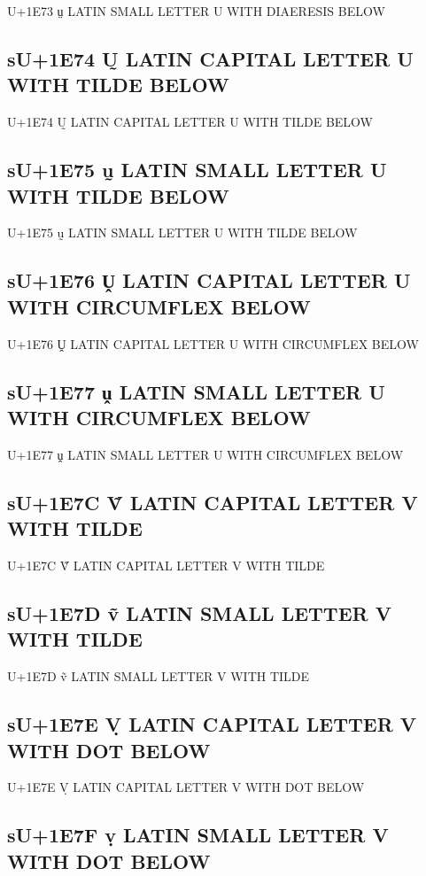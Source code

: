 U+1E73 ṳ LATIN SMALL LETTER U WITH DIAERESIS BELOW

\subsection{sU+1E74 Ṵ LATIN CAPITAL LETTER U WITH TILDE BELOW}

U+1E74 Ṵ LATIN CAPITAL LETTER U WITH TILDE BELOW

\subsection{sU+1E75 ṵ LATIN SMALL LETTER U WITH TILDE BELOW}

U+1E75 ṵ LATIN SMALL LETTER U WITH TILDE BELOW

\subsection{sU+1E76 Ṷ LATIN CAPITAL LETTER U WITH CIRCUMFLEX BELOW}

U+1E76 Ṷ LATIN CAPITAL LETTER U WITH CIRCUMFLEX BELOW

\subsection{sU+1E77 ṷ LATIN SMALL LETTER U WITH CIRCUMFLEX BELOW}

U+1E77 ṷ LATIN SMALL LETTER U WITH CIRCUMFLEX BELOW

\subsection{sU+1E7C Ṽ LATIN CAPITAL LETTER V WITH TILDE}

U+1E7C Ṽ LATIN CAPITAL LETTER V WITH TILDE

\subsection{sU+1E7D ṽ LATIN SMALL LETTER V WITH TILDE}

U+1E7D ṽ LATIN SMALL LETTER V WITH TILDE

\subsection{sU+1E7E Ṿ LATIN CAPITAL LETTER V WITH DOT BELOW}

U+1E7E Ṿ LATIN CAPITAL LETTER V WITH DOT BELOW

\subsection{sU+1E7F ṿ LATIN SMALL LETTER V WITH DOT BELOW}


